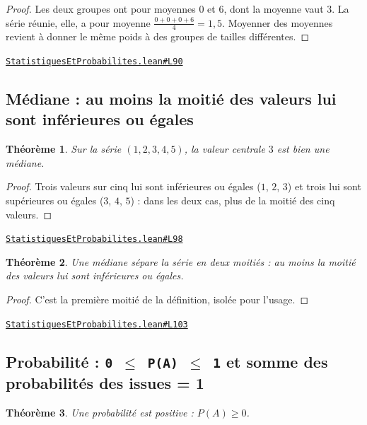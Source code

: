 \documentclass[11pt,a4paper]{article}
\theoremstyle{definition}
\theoremstyle{plain}
\newtheorem{theoreme}{Théorème}
\newcommand{\source}[2]{\par\smallskip\noindent\hfill{\footnotesize\href{#1}{\texttt{#2}}}\par\smallskip}
\begin{document}
\begin{proof}
Les deux groupes ont pour moyennes $0$ et $6$, dont la moyenne vaut $3$. La série
réunie, elle, a pour moyenne $\tfrac{0+0+0+6}{4} = 1{,}5$. Moyenner des moyennes revient
à donner le même poids à des groupes de tailles différentes.
\end{proof}
\source{https://github.com/Commutator-IO/learn-lean/blob/main/cours/01-college/06-statistiques-et-probabilites/StatistiquesEtProbabilites.lean\#L90}{StatistiquesEtProbabilites.lean\#L90}

\subsection{Médiane : au moins la moitié des valeurs lui sont inférieures ou égales}

\begin{theoreme}
Sur la série $(1, 2, 3, 4, 5)$, la valeur centrale $3$ est bien une médiane.
\end{theoreme}

\begin{proof}
Trois valeurs sur cinq lui sont inférieures ou égales ($1$, $2$, $3$) et trois lui sont
supérieures ou égales ($3$, $4$, $5$) : dans les deux cas, plus de la moitié des cinq
valeurs.
\end{proof}
\source{https://github.com/Commutator-IO/learn-lean/blob/main/cours/01-college/06-statistiques-et-probabilites/StatistiquesEtProbabilites.lean\#L98}{StatistiquesEtProbabilites.lean\#L98}

\begin{theoreme}
Une médiane sépare la série en deux moitiés : au moins la moitié des valeurs lui sont
inférieures ou égales.
\end{theoreme}

\begin{proof}
C'est la première moitié de la définition, isolée pour l'usage.
\end{proof}
\source{https://github.com/Commutator-IO/learn-lean/blob/main/cours/01-college/06-statistiques-et-probabilites/StatistiquesEtProbabilites.lean\#L103}{StatistiquesEtProbabilites.lean\#L103}

\subsection{Probabilité : \texttt{0 \(\le\) P(A) \(\le\) 1} et somme des probabilités des issues = 1}

\begin{theoreme}
Une probabilité est positive : $P(A) \ge 0$.
\end{theoreme}
\end{document}
